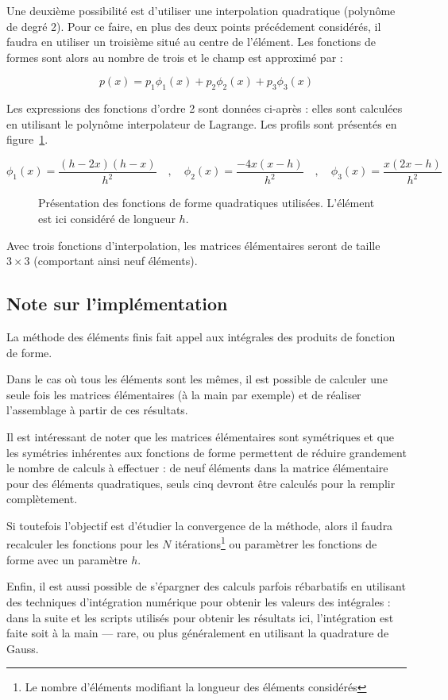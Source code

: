 Une deuxième possibilité est d'utiliser une interpolation quadratique (polynôme de degré 2). Pour ce faire, en plus des
deux points précédement considérés, il faudra en utiliser un troisième situé au centre de l'élément. Les fonctions de
formes sont alors au nombre de trois et le champ est approximé par :

$$p(x) = p_1\phi_1(x) + p_2\phi_2(x) + p_3\phi_3(x)$$

Les expressions des fonctions d'ordre 2 sont données ci-après : elles sont calculées en utilisant le polynôme
interpolateur de Lagrange. Les profils sont présentés en figure~\ref{fig:FEM:shape_fun_quad}.

\begin{equation*}
	\phi_1(x) = \frac{(h-2x)(h-x)}{h^2} \quad,\quad \phi_2(x) = \frac{-4x(x-h)}{h^2} \quad,\quad \phi_3(x) = \frac{x(2x-h)}{h^2}
\end{equation*}

\begin{figure}[!ht]
	\centering
	
	\caption{\label{fig:FEM:shape_fun_quad}Présentation des fonctions de forme quadratiques utilisées. L'élément est ici considéré
	de longueur $h$.}
\end{figure}

Avec trois fonctions d'interpolation, les matrices élémentaires seront de taille $3\times 3$ (comportant ainsi neuf éléments).

\subsection{Note sur l'implémentation}

La méthode des éléments finis fait appel aux intégrales des produits de fonction de forme.

Dans le cas où tous les éléments sont les mêmes, il est possible de calculer une seule fois les matrices élémentaires (à
la main par exemple) et de réaliser l'assemblage à partir de ces résultats.

Il est intéressant de noter que les matrices élémentaires sont symétriques et que les symétries inhérentes aux fonctions de forme
permettent de réduire grandement le nombre de calculs à effectuer : de neuf éléments dans la matrice élémentaire pour des
éléments quadratiques, seuls cinq devront être calculés pour la remplir complètement. 

Si toutefois l'objectif est d'étudier la convergence de la méthode, alors il faudra recalculer les fonctions pour les
$N$ itérations\footnote{Le nombre d'éléments modifiant la longueur des éléments considérés} ou paramètrer les fonctions de forme avec un paramètre $h$.

Enfin, il est aussi possible de s'épargner des calculs parfois rébarbatifs en utilisant des techniques
d'intégration numérique pour obtenir les valeurs des intégrales : dans la suite et les scripts utilisés pour obtenir les
résultats ici, l'intégration est faite soit à la main --- rare, ou plus généralement en utilisant la quadrature de
Gauss.

